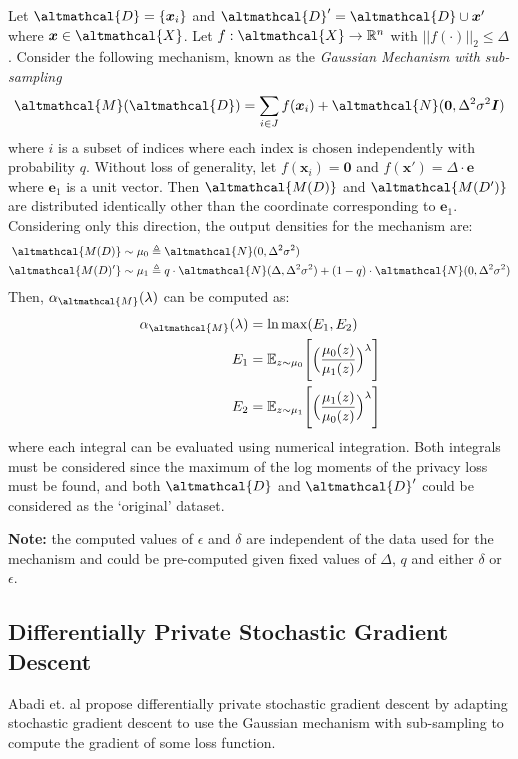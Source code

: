 Let $\altmathcal{D} = \lbrace \bm{x}_i \rbrace$ and $\altmathcal{D}' = \altmathcal{D} \cup \bm{x}'$ where $\bm{x} \in \altmathcal{X}$. Let $f: \altmathcal{X} \rightarrow \mathbb{R}^n$ with $||f(\cdot)||_2 \leq \Delta$. Consider the following mechanism, known as the \emph{Gaussian Mechanism with sub-sampling}
\begin{align}
\altmathcal{M}(\altmathcal{D}) = \sum_{i \in J} f(\bm{x}_i) + \altmathcal{N}(\bm{0}, \Delta^2 \sigma^2 \bm{I})
\end{align}
where $i$ is a subset of indices where each index is chosen independently with probability $q$. Without loss of generality, let $f(\bm{x}_i) = \bm{0}$ and $f(\bm{x}') = \Delta\cdot\bm{e}$ where $\bm{e}_1$ is a unit vector. Then $\altmathcal{M(D)}$ and  $\altmathcal{M(D')}$ are distributed identically other than the coordinate corresponding to $\bm{e}_1$. Considering only this direction, the output densities for the mechanism are:
\begin{align}
\altmathcal{M(D)} \sim \mu_0 &\triangleq \altmathcal{N}(0, \Delta^2 \sigma^2) \\ \altmathcal{M(D)'} \sim \mu_1 &\triangleq q\cdot\altmathcal{N}(\Delta, \Delta^2 \sigma^2) + (1-q)\cdot\altmathcal{N}(0, \Delta^2 \sigma^2) 
\end{align}
Then, $\alpha_\altmathcal{M}(\lambda)$ can be computed as:
\begin{align}
\alpha_\altmathcal{M}(\lambda) &= \ln \max (E_1, E_2) \\
E_1 &= \mathbb{E}_{z \sim \mu_0} \Bigg[ \Big(\frac{\mu_0(z)}{\mu_1(z)}\Big)^\lambda \Bigg] \\
E_2 &= \mathbb{E}_{z \sim \mu_1} \Bigg[ \Big(\frac{\mu_1(z)}{\mu_0(z)}\Big)^\lambda \Bigg]
\end{align}
where each integral can be evaluated using numerical integration. Both integrals must be considered since the maximum of the log moments of the privacy loss must be found, and both $\altmathcal{D}$ and $\altmathcal{D}'$ could be considered as the `original' dataset. \cite{moments_account}

\textbf{Note: }the computed values of $\epsilon$ and $\delta$ are independent of the data used for the mechanism and could be pre-computed given fixed values of $\Delta$, $q$ and either $\delta$ or $\epsilon$. 

\subsection{Differentially Private Stochastic Gradient Descent}
Abadi et. al propose differentially private stochastic gradient descent by adapting stochastic gradient descent to use the Gaussian mechanism with sub-sampling to compute the gradient of some loss function. \cite{moments_account}  

